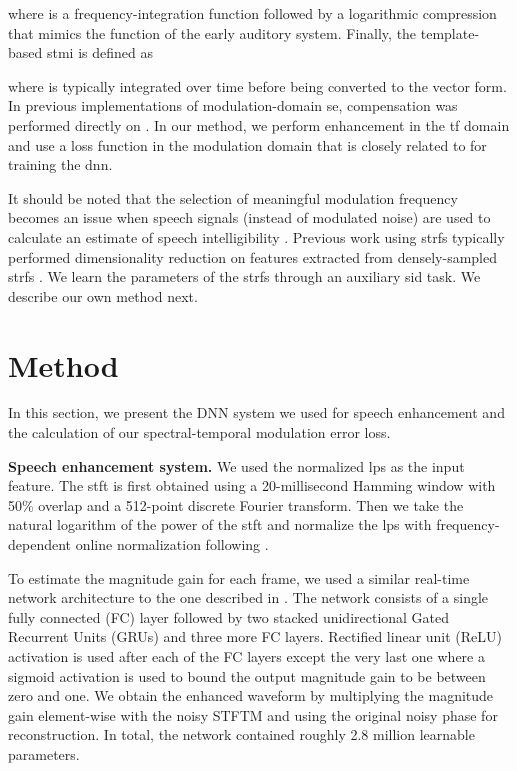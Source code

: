 \documentclass{article}
\begin{document}
 where  is a frequency-integration function followed by a logarithmic compression that mimics the function of the early auditory system. Finally, the template-based \gls{stmi} \cite{elhilaliSpectrotemporalModulationIndex2003} is defined as

where  is typically integrated over time before being converted to the vector form. In previous implementations of  modulation-domain \gls{se}, compensation was performed directly on  \cite{mesgaraniDenoisingDomainSpectrotemporal2007,mirbagheriNonlinearFilteringSpectrotemporal2010}. In our method, we perform enhancement in the \gls{tf} domain and use a loss function in the modulation domain that is closely related to  for training the \gls{dnn}. 

It should be noted that the selection of meaningful modulation frequency becomes an issue when speech signals (instead of modulated noise) are used to calculate an estimate of speech intelligibility \cite{paytonMethodDetermineSpeech1999}. Previous work using \gls{strf}s typically performed dimensionality reduction on features extracted from densely-sampled \gls{strf}s \cite{mesgaraniDiscriminationSpeechNonspeech2006,meyerRobustnessSpectrotemporalFeatures2011,ravuriEasyDoesIt2012}. We learn the parameters of the \gls{strf}s through an auxiliary \gls{sid} task. We describe our own method next.

\section{Method}
In this section, we present the DNN system we used for speech enhancement and the calculation of our spectral-temporal modulation error loss.

\textbf{Speech enhancement system.}
We used the normalized \gls{lps} as the input feature.  The \gls{stft} is first obtained using a 20-millisecond Hamming window with 50\% overlap and a 512-point discrete Fourier transform.  Then we take the natural logarithm of the power of the \gls{stft} and normalize the \gls{lps} with frequency-dependent online normalization following \cite{xiaWeightedSpeechDistortion2020}.

To estimate the magnitude gain for each frame, we used a similar real-time network architecture to the one described in \cite{braunConsolidatedViewLoss2020}.  The network consists of a single fully connected (FC) layer followed by two stacked unidirectional Gated Recurrent Units (GRUs) and three more FC layers.  Rectified linear unit (ReLU) activation is used after each of the FC layers except the very last one where a sigmoid activation is used to bound the output magnitude gain to be between zero and one.  We obtain the enhanced waveform by multiplying the magnitude gain element-wise with the noisy STFTM and using the original noisy phase for reconstruction.  In total, the network contained roughly 2.8 million learnable parameters. 
\end{document}
